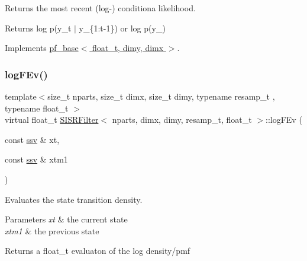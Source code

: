 Returns the most recent (log-\/) conditiona likelihood. 

\begin{DoxyReturn}{Returns}
log p(y\+\_\+t $\vert$ y\+\_\+\{1\+:t-\/1\}) or log p(y\+\_) 
\end{DoxyReturn}


Implements \hyperlink{classpf__base_a350df818820d6ab0fd6d413022b7f23b}{pf\+\_\+base$<$ float\+\_\+t, dimy, dimx $>$}.

\mbox{\label{classSISRFilter_a7aa1e90a0b641728d5f8d7bd8c699ba8}} 
\subsubsection{\texorpdfstring{log\+F\+Ev()}{logFEv()}}
{\footnotesize\ttfamily template$<$size\+\_\+t nparts, size\+\_\+t dimx, size\+\_\+t dimy, typename resamp\+\_\+t , typename float\+\_\+t $>$ \\
virtual float\+\_\+t \hyperlink{classSISRFilter}{S\+I\+S\+R\+Filter}$<$ nparts, dimx, dimy, resamp\+\_\+t, float\+\_\+t $>$\+::log\+F\+Ev (\begin{DoxyParamCaption}\item[{const \hyperlink{classSISRFilter_abfec45cf57ea6fadae4a9da8b0042351}{ssv} \&}]{xt,  }\item[{const \hyperlink{classSISRFilter_abfec45cf57ea6fadae4a9da8b0042351}{ssv} \&}]{xtm1 }\end{DoxyParamCaption})\hspace{0.3cm}{\ttfamily [pure virtual]}}



Evaluates the state transition density. 


\begin{DoxyParams}{Parameters}
{\em xt} & the current state \\
\hline
{\em xtm1} & the previous state \\
\hline
\end{DoxyParams}
\begin{DoxyReturn}{Returns}
a float\+\_\+t evaluaton of the log density/pmf 
\end{DoxyReturn}
\mbox{\label{classSISRFilter_a73fe8481e4cb40142544c04823851aa8}} 
